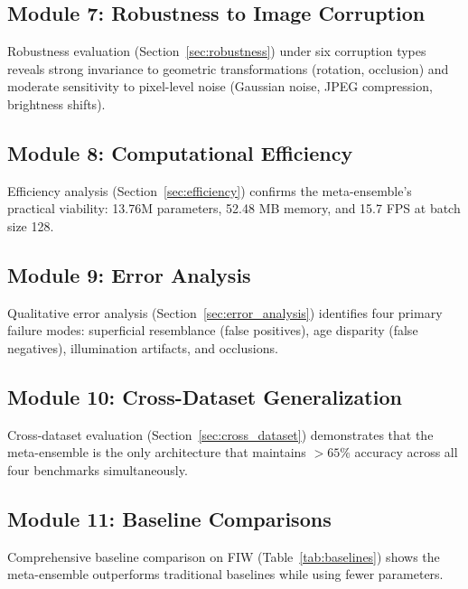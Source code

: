 \documentclass[journal,12pt]{IEEEtran}
\begin{document}
\subsection{Module 7: Robustness to Image Corruption}
Robustness evaluation (Section~\ref{sec:robustness}) under six corruption
types reveals strong invariance to geometric transformations
(rotation, occlusion) and moderate sensitivity to pixel-level noise
(Gaussian noise, JPEG compression, brightness shifts).

\subsection{Module 8: Computational Efficiency}
Efficiency analysis (Section~\ref{sec:efficiency}) confirms the
meta-ensemble's practical viability: 13.76M parameters, 52.48 MB memory,
and 15.7 FPS at batch size 128.

\subsection{Module 9: Error Analysis}
Qualitative error analysis (Section~\ref{sec:error_analysis}) identifies
four primary failure modes: superficial resemblance (false positives),
age disparity (false negatives), illumination artifacts, and occlusions.

\subsection{Module 10: Cross-Dataset Generalization}
Cross-dataset evaluation (Section~\ref{sec:cross_dataset}) demonstrates
that the meta-ensemble is the only architecture that maintains $>65\%$
accuracy across all four benchmarks simultaneously.

\subsection{Module 11: Baseline Comparisons}
Comprehensive baseline comparison on FIW (Table~\ref{tab:baselines})
shows the meta-ensemble outperforms traditional baselines while using
fewer parameters.
\end{document}
